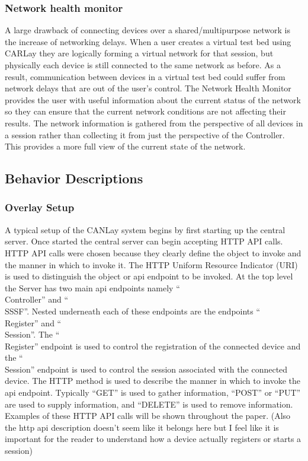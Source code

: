 \documentclass[letterpaper,twocolumn,12pt]{article}
\begin{document}
\subsubsection{Network health monitor}
A large drawback of connecting devices over a shared/multipurpose network is the increase of networking delays. When a user creates a virtual test bed using CARLay they are logically forming a virtual network for that session, but physically each device is still connected to the same network as before. As a result, communication between devices in a virtual test bed could suffer from network delays that are out of the user’s control. The Network Health Monitor provides the user with useful information about the current status of the network so they can ensure that the current network conditions are not affecting their results. The network information is gathered from the perspective of all devices in a session rather than collecting it from just the perspective of the Controller. This provides a more full view of the current state of the network.

\subsection{Behavior Descriptions}

\subsubsection{Overlay Setup}
A typical setup of the CANLay system begins by first starting up the central server. Once started the central server can begin accepting HTTP API calls. HTTP API calls were chosen because they clearly define the object to invoke and the manner in which to invoke it. The HTTP Uniform Resource Indicator (URI) is used to distinguish the object or api endpoint to be invoked. At the top level the Server has two main api endpoints namely “\\Controller” and “\\SSSF”. Nested underneath each of these endpoints are the endpoints “\\Register” and “\\Session”. The “\\Register” endpoint is used to control the registration of the connected device and the “\\Session” endpoint is used to control the session associated with the connected device. The HTTP method is used to describe the manner in which to invoke the api endpoint. Typically “GET” is used to gather information, “POST” or “PUT” are used to supply information, and “DELETE” is used to remove information. Examples of these HTTP API calls will be shown throughout the paper. (Also the http api description doesn’t seem like it belongs here but I feel like it is important for the reader to understand how a device actually registers or starts a session)
\end{document}
